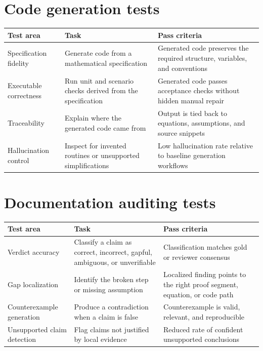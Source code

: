 \section{Code generation tests}

\begin{longtable}{p{}p{}p{}}
\toprule
\textbf{Test area} & \textbf{Task} & \textbf{Pass criteria} \\
\midrule
Specification fidelity & Generate code from a mathematical specification & Generated code preserves the required structure, variables, and conventions \\
Executable correctness & Run unit and scenario checks derived from the specification & Generated code passes acceptance checks without hidden manual repair \\
Traceability & Explain where the generated code came from & Output is tied back to equations, assumptions, and source snippets \\
Hallucination control & Inspect for invented routines or unsupported simplifications & Low hallucination rate relative to baseline generation workflows \\
\bottomrule
\end{longtable}

\section{Documentation auditing tests}

\begin{longtable}{p{}p{}p{}}
\toprule
\textbf{Test area} & \textbf{Task} & \textbf{Pass criteria} \\
\midrule
Verdict accuracy & Classify a claim as correct, incorrect, gapful, ambiguous, or unverifiable & Classification matches gold or reviewer consensus \\
Gap localization & Identify the broken step or missing assumption & Localized finding points to the right proof segment, equation, or code path \\
Counterexample generation & Produce a contradiction when a claim is false & Counterexample is valid, relevant, and reproducible \\
Unsupported claim detection & Flag claims not justified by local evidence & Reduced rate of confident unsupported conclusions \\
\bottomrule
\end{longtable}


